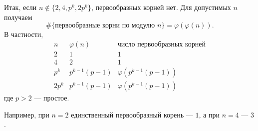 \documentclass[12pt,a4paper]{article}
\begin{document}
Итак, если $n\notin\{2,4,p^k,2p^k\}$, первообразных корней нет. Для допустимых $n$ получаем
\[
\#\{\text{первообразные корни по модулю }n\}
=\varphi(\varphi(n)).
\]
В частности,
\[
\begin{array}{c|c|c}
n & \varphi(n) & \text{число первообразных корней}\\
\hline
2 & 1 & 1\\
4 & 2 & 1\\
p^k & p^{k-1}(p-1) &
\varphi\!\left(p^{k-1}(p-1)\right)\\
2p^k & p^{k-1}(p-1) &
\varphi\!\left(p^{k-1}(p-1)\right)
\end{array}
\]
где $p>2$ --- простое.

Например, при $n=2$ единственный первообразный корень --- $1$, а при $n=4$ --- $3$.
\end{document}

